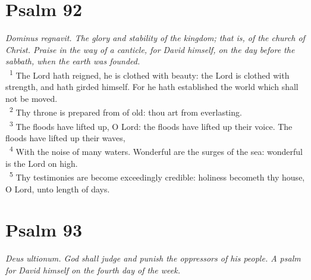 \documentclass[a5paper,12pt]{article}
\begin{document}
\begin{multicols*}{2}
\section{Psalm 92}
\label{sec:org198b54e}
\emph{Dominus regnavit. The glory and stability of the kingdom; that is, of the church of Christ. Praise in the way of a canticle, for David himself, on the day before the sabbath, when the earth was founded.}\\

~\textsuperscript{1} The Lord hath reigned, he is clothed with beauty: the Lord is clothed with strength, and hath girded himself. For he hath established the world which shall not be moved.\\
~\textsuperscript{2} Thy throne is prepared from of old: thou art from everlasting.\\
~\textsuperscript{3} The floods have lifted up, O Lord: the floods have lifted up their voice. The floods have lifted up their waves,\\
~\textsuperscript{4} With the noise of many waters. Wonderful are the surges of the sea: wonderful is the Lord on high.\\
~\textsuperscript{5} Thy testimonies are become exceedingly credible: holiness becometh thy house, O Lord, unto length of days.\\

\section{Psalm 93}
\label{sec:org6fa5784}
\emph{Deus ultionum. God shall judge and punish the oppressors of his people. A psalm for David himself on the fourth day of the week.}\\


\end{multicols*}
\end{document}
